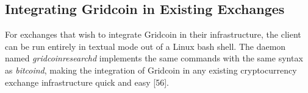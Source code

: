 \subsection{Integrating Gridcoin in Existing Exchanges}

For exchanges that wish to integrate Gridcoin in their infrastructure, the client can be run entirely in textual mode out of a Linux bash shell. The daemon named \textit{gridcoinresearchd} implements the same commands with the same syntax as \textit{bitcoind}, making the integration of Gridcoin in any existing cryptocurrency exchange infrastructure quick and easy [56].\\
